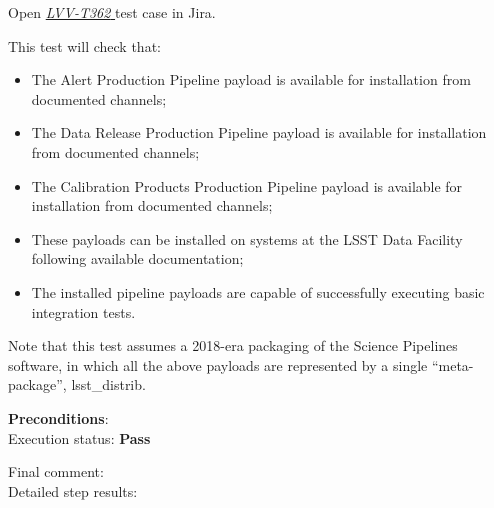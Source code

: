 \documentclass[DM,lsstdraft,STR,toc]{lsstdoc}
\providecommand{\tightlist}{
  \setlength{\itemsep}{0pt}\setlength{\parskip}{0pt}}
\begin{document}
Open  \href{https://jira.lsstcorp.org/secure/Tests.jspa#/testCase/LVV-T362}{\textit{ LVV-T362 } }
test case in Jira.

    This test will check that:

\begin{itemize}
\tightlist
\item
  The Alert Production Pipeline payload is available for installation
  from documented channels;
\item
  The Data Release Production Pipeline payload is available for
  installation from documented channels;
\item
  The Calibration Products Production Pipeline payload is available for
  installation from documented channels;
\item
  These payloads can be installed on systems at the LSST Data Facility
  following available documentation;
\item
  The installed pipeline payloads are capable of successfully executing
  basic integration tests.
\end{itemize}

Note that this test assumes a 2018-era packaging of the Science
Pipelines software, in which all the above payloads are represented by a
single ``meta-package'', lsst\_distrib.


    {\bf Preconditions}:\\
    

    Execution status: {\bf Pass }

    Final comment:\\


    Detailed step results:
\end{document}
